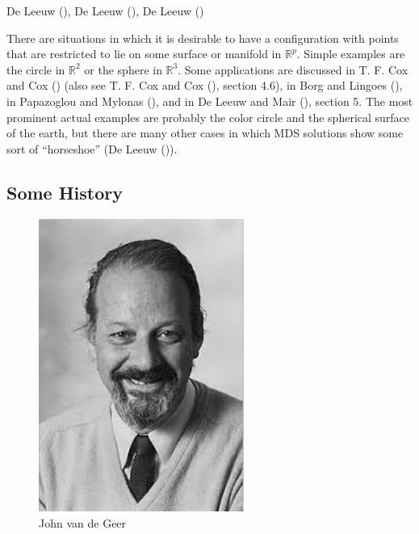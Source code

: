 \documentclass[
  12pt,
  letterpaper,
  DIV=11,
  numbers=noendperiod]{scrreprt}
\theoremstyle{remark}
\begin{document}
De Leeuw (), De Leeuw
(), De Leeuw
()

There are situations in which it is desirable to have a configuration
with points that are restricted to lie on some surface or manifold in
\(\mathbb{R}^p\). Simple examples are the circle in \(\mathbb{R}^2\) or
the sphere in \(\mathbb{R}^3\). Some applications are discussed in T. F.
Cox and Cox () (also see T. F. Cox and
Cox (), section 4.6), in Borg and Lingoes
(), in Papazoglou and Mylonas
(), and in De Leeuw and Mair
(), section 5. The most prominent
actual examples are probably the color circle and the spherical surface
of the earth, but there are many other cases in which MDS solutions show
some sort of ``horseshoe'' (De Leeuw
()).

\subsection{Some History}\label{circhist}

\begin{figure}[H]

{\centering \includegraphics[width=0.6\textwidth,height=\textheight]{graphics/johnvdg.jpeg}

}

\caption{John van de Geer}

\end{figure}%
\end{document}
